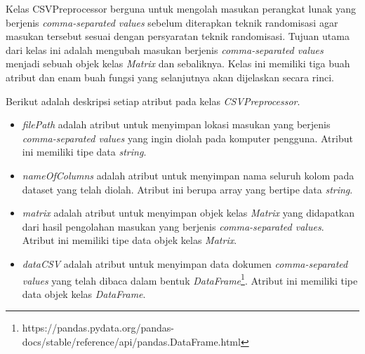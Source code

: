 Kelas CSVPreprocessor berguna untuk mengolah masukan perangkat lunak yang berjenis \textit{comma-separated values} sebelum diterapkan teknik randomisasi agar masukan tersebut sesuai dengan persyaratan teknik randomisasi. Tujuan utama dari kelas ini adalah mengubah masukan berjenis \textit{comma-separated values} menjadi sebuah objek kelas \textit{Matrix} dan sebaliknya. Kelas ini memiliki tiga buah atribut dan enam buah fungsi yang selanjutnya akan dijelaskan secara rinci.

Berikut adalah deskripsi setiap atribut pada kelas \textit{CSVPreprocessor}.
\begin{itemize}
	\item \textit{filePath} adalah atribut untuk menyimpan lokasi masukan yang berjenis \textit{comma-separated values} yang ingin diolah pada komputer pengguna. Atribut ini memiliki tipe data \textit{string}.
	\item \textit{nameOfColumns} adalah atribut untuk menyimpan nama seluruh kolom pada dataset yang telah diolah. Atribut ini berupa array yang bertipe data \textit{string}.
	\item \textit{matrix} adalah atribut untuk menyimpan objek kelas \textit{Matrix} yang didapatkan dari hasil pengolahan masukan yang berjenis \textit{comma-separated values}. Atribut ini memiliki tipe data objek kelas \textit{Matrix}.
	\item \textit{dataCSV} adalah atribut untuk menyimpan data dokumen \textit{comma-separated values} yang telah dibaca dalam bentuk \textit{DataFrame}\footnote{https://pandas.pydata.org/pandas-docs/stable/reference/api/pandas.DataFrame.html}. Atribut ini memiliki tipe data objek kelas \textit{DataFrame}.
\end{itemize}

